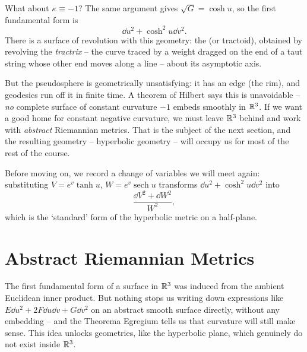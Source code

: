 \documentclass[a4paper]{scrartcl}
\begin{document}
What about $\kappa \equiv -1$? The same argument gives $\sqrt{G} = \cosh u$, so the first fundamental form is
$$
\dd u^2 + \cosh^2 u \dd v^2.
$$
There is a surface of revolution with this geometry: the  (or tractoid), obtained by revolving the \emph{tractrix} -- the curve traced by a weight dragged on the end of a taut string whose other end moves along a line -- about its asymptotic axis.
\begin{center}
\end{center}
But the pseudosphere is geometrically unsatisfying: it has an edge (the rim), and geodesics run off it in finite time. A theorem of Hilbert says this is unavoidable -- \emph{no} complete surface of constant curvature $-1$ embeds smoothly in $\mathbb{R}^3$. If we want a good home for constant negative curvature, we must leave $\mathbb{R}^3$ behind and work with \emph{abstract} Riemannian metrics. That is the subject of the next section, and the resulting geometry -- hyperbolic geometry -- will occupy us for most of the rest of the course.

Before moving on, we record a change of variables we will meet again: substituting $V = e^{v}\tanh u$, $W = e^{v}\operatorname{sech} u$ transforms $\dd u^2 + \cosh^2 u \dd v^2$ into
$$
\frac{\dd V^2 + \dd W^2}{W^2},
$$
which is the `standard' form of the hyperbolic metric on a half-plane.

\section{Abstract Riemannian Metrics}\label{sec:riemannianmetrics}

The first fundamental form of a surface in $\mathbb{R}^3$ was induced from the ambient Euclidean inner product. But nothing stops us writing down expressions like $E \dd u^2 + 2F \dd u \dd v + G \dd v^2$ on an abstract smooth surface directly, without any embedding -- and the Theorema Egregium tells us that curvature will still make sense. This idea unlocks geometries, like the hyperbolic plane, which genuinely do not exist inside $\mathbb{R}^3$.
\end{document}
